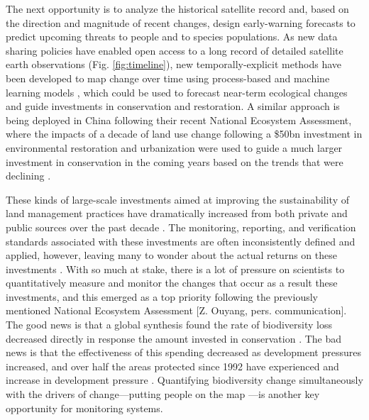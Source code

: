 The next opportunity is to analyze the historical satellite record and, based on the direction and magnitude of recent changes, design early-warning forecasts to predict upcoming threats to people and to species populations. As new data sharing policies have enabled open access to a long record of detailed satellite earth observations (Fig. \ref{fig:timeline}), new temporally-explicit methods have been developed to map change over time using process-based and machine learning models \cite{Cohen2018-xk, Rao2020-qk}, which could be used to forecast near-term ecological changes and guide investments in conservation and restoration. A similar approach is being deployed in China following their recent National Ecosystem Assessment, where the impacts of a decade of land use change following a \$50bn investment in environmental restoration and urbanization were used to guide a much larger investment in conservation in the coming years based on the trends that were declining \cite{Ouyang2016-il, Bryan2018-xz}.

These kinds of large-scale investments aimed at improving the sustainability of land management practices have dramatically increased from both private and public sources over the past decade \cite{hamrick2016state}. The monitoring, reporting, and verification standards associated with these investments are often inconsistently defined and applied, however, leaving many to wonder about the actual returns on these investments \cite{Ferraro2006-gj, Engel2008-bq, Sexton2016-vb}. With so much at stake, there is a lot of pressure on scientists to quantitatively measure and monitor the changes that occur as a result these investments, and this emerged as a top priority following the previously mentioned National Ecosystem Assessment [Z. Ouyang, pers. communication]. The good news is that a global synthesis found the rate of biodiversity loss decreased directly in response the amount invested in conservation \cite{Waldron2017-ct}. The bad news is that the effectiveness of this spending decreased as development pressures increased, and over half the areas protected since 1992 have experienced and increase in development pressure \cite{Jones2018-uv}. Quantifying biodiversity change simultaneously with the drivers of change—putting people on the map \cite{Ellis2008-xj}—is another key opportunity for monitoring systems.

